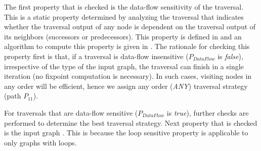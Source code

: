 The first property that is checked is the data-flow sensitivity of the
traversal. This is a static property determined by analyzing the traversal that
indicates whether the traversal output of any node is dependent on the traversal
output of its neighbors (successors or predecessors). This property is defined
in  and an algorithm to compute this property is given in
. The rationale for checking this property first is
that, if a traversal is data-flow insensitive ($P_{DataFlow}$ is
\textit{false}), irrespective of the type of the input graph, the traversal
can finish in a single iteration (no fixpoint computation is necessary). In
such cases, visiting nodes in any order will be efficient, hence we assign
any order (\textit{ANY}) traversal strategy (path $P_{11}$).

For traversals that are data-flow sensitive ($P_{DataFlow}$ is \textit{true}),
further checks are performed to determine the best traversal strategy. Next
property that is checked is the input graph \graphprop{}.
This is because the loop sensitive property is applicable to only graphs with
loops. 
